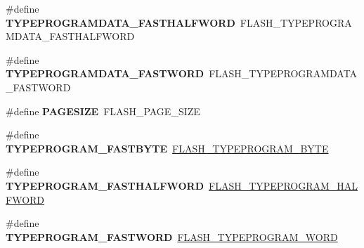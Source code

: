 \begin{DoxyCompactItemize}
\item 
\#define {\bfseries T\+Y\+P\+E\+P\+R\+O\+G\+R\+A\+M\+D\+A\+T\+A\+\_\+\+F\+A\+S\+T\+H\+A\+L\+F\+W\+O\+RD}~F\+L\+A\+S\+H\+\_\+\+T\+Y\+P\+E\+P\+R\+O\+G\+R\+A\+M\+D\+A\+T\+A\+\_\+\+F\+A\+S\+T\+H\+A\+L\+F\+W\+O\+RD\hypertarget{group___h_a_l___f_l_a_s_h___aliased___defines_gaa7602be5fde7d3dfbc33cd647ade049f}{}\label{group___h_a_l___f_l_a_s_h___aliased___defines_gaa7602be5fde7d3dfbc33cd647ade049f}

\item 
\#define {\bfseries T\+Y\+P\+E\+P\+R\+O\+G\+R\+A\+M\+D\+A\+T\+A\+\_\+\+F\+A\+S\+T\+W\+O\+RD}~F\+L\+A\+S\+H\+\_\+\+T\+Y\+P\+E\+P\+R\+O\+G\+R\+A\+M\+D\+A\+T\+A\+\_\+\+F\+A\+S\+T\+W\+O\+RD\hypertarget{group___h_a_l___f_l_a_s_h___aliased___defines_ga871de63c00336d70644a300bc2a67f01}{}\label{group___h_a_l___f_l_a_s_h___aliased___defines_ga871de63c00336d70644a300bc2a67f01}

\item 
\#define {\bfseries P\+A\+G\+E\+S\+I\+ZE}~F\+L\+A\+S\+H\+\_\+\+P\+A\+G\+E\+\_\+\+S\+I\+ZE\hypertarget{group___h_a_l___f_l_a_s_h___aliased___defines_ga519adc2af3ba06a8f0548b6690050a89}{}\label{group___h_a_l___f_l_a_s_h___aliased___defines_ga519adc2af3ba06a8f0548b6690050a89}

\item 
\#define {\bfseries T\+Y\+P\+E\+P\+R\+O\+G\+R\+A\+M\+\_\+\+F\+A\+S\+T\+B\+Y\+TE}~\hyperlink{group___f_l_a_s_h___type___program_gac975d7139325057ed0069c6b55e4faed}{F\+L\+A\+S\+H\+\_\+\+T\+Y\+P\+E\+P\+R\+O\+G\+R\+A\+M\+\_\+\+B\+Y\+TE}\hypertarget{group___h_a_l___f_l_a_s_h___aliased___defines_ga07e4cba7de4bf96cfafa957245f9d06d}{}\label{group___h_a_l___f_l_a_s_h___aliased___defines_ga07e4cba7de4bf96cfafa957245f9d06d}

\item 
\#define {\bfseries T\+Y\+P\+E\+P\+R\+O\+G\+R\+A\+M\+\_\+\+F\+A\+S\+T\+H\+A\+L\+F\+W\+O\+RD}~\hyperlink{group___f_l_a_s_h___type___program_ga2b607dfc2efd463a8530e327bc755582}{F\+L\+A\+S\+H\+\_\+\+T\+Y\+P\+E\+P\+R\+O\+G\+R\+A\+M\+\_\+\+H\+A\+L\+F\+W\+O\+RD}\hypertarget{group___h_a_l___f_l_a_s_h___aliased___defines_gad562e3d208ce464a19d5ec356e7f21ff}{}\label{group___h_a_l___f_l_a_s_h___aliased___defines_gad562e3d208ce464a19d5ec356e7f21ff}

\item 
\#define {\bfseries T\+Y\+P\+E\+P\+R\+O\+G\+R\+A\+M\+\_\+\+F\+A\+S\+T\+W\+O\+RD}~\hyperlink{group___f_l_a_s_h___type___program_gadd25c6821539030ba6711e7c0d586c3e}{F\+L\+A\+S\+H\+\_\+\+T\+Y\+P\+E\+P\+R\+O\+G\+R\+A\+M\+\_\+\+W\+O\+RD}\hypertarget{group___h_a_l___f_l_a_s_h___aliased___defines_ga1c170a7eba13377a1922bf6750b1f0ce}{}\label{group___h_a_l___f_l_a_s_h___aliased___defines_ga1c170a7eba13377a1922bf6750b1f0ce}


\end{DoxyCompactItemize}
